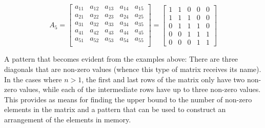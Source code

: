 \documentclass[12pt,letterpaper,final]{report}
\begin{document}
\[
  A_5 =
  \begin{bmatrix}
    a_{11} & a_{12} & a_{13} & a_{14} & a_{15} \\
    a_{21} & a_{22} & a_{23} & a_{24} & a_{25} \\
    a_{31} & a_{32} & a_{33} & a_{34} & a_{35} \\
    a_{41} & a_{42} & a_{43} & a_{44} & a_{45} \\
    a_{51} & a_{52} & a_{53} & a_{54} & a_{55} \\
  \end{bmatrix}
  =
  \begin{bmatrix}
    1 & 1 & 0 & 0 & 0 \\
    1 & 1 & 1 & 0 & 0 \\
    0 & 1 & 1 & 1 & 0 \\
    0 & 0 & 1 & 1 & 1 \\
    0 & 0 & 0 & 1 & 1
  \end{bmatrix}
\]

A pattern that becomes evident from the examples above: There are three diagonals that are non-zero values (whence this type of matrix receives its name). In the cases where $n > 1$, the first and last rows of the matrix only have two non-zero values, while each of the intermediate rows have up to three non-zero values. This provides as means for finding the upper bound to the number of non-zero elements in the matrix and a pattern that can be used to construct an arrangement of the elements in memory.
\end{document}
